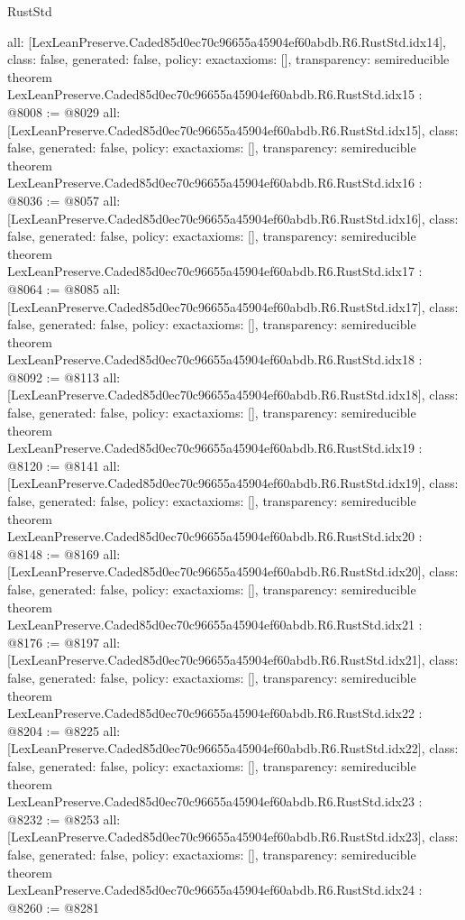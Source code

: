 \begin{lexlean}{RustStd}
\begin{coremodule}
{  all: [LexLeanPreserve.Caded85d0ec70c96655a45904ef60abdb.R6.RustStd.idx14],
  class: false,
  generated: false,
  policy: exact{axioms: []},
  transparency: semireducible
}
theorem LexLeanPreserve.Caded85d0ec70c96655a45904ef60abdb.R6.RustStd.idx15 : @8008 := @8029 {
  all: [LexLeanPreserve.Caded85d0ec70c96655a45904ef60abdb.R6.RustStd.idx15],
  class: false,
  generated: false,
  policy: exact{axioms: []},
  transparency: semireducible
}
theorem LexLeanPreserve.Caded85d0ec70c96655a45904ef60abdb.R6.RustStd.idx16 : @8036 := @8057 {
  all: [LexLeanPreserve.Caded85d0ec70c96655a45904ef60abdb.R6.RustStd.idx16],
  class: false,
  generated: false,
  policy: exact{axioms: []},
  transparency: semireducible
}
theorem LexLeanPreserve.Caded85d0ec70c96655a45904ef60abdb.R6.RustStd.idx17 : @8064 := @8085 {
  all: [LexLeanPreserve.Caded85d0ec70c96655a45904ef60abdb.R6.RustStd.idx17],
  class: false,
  generated: false,
  policy: exact{axioms: []},
  transparency: semireducible
}
theorem LexLeanPreserve.Caded85d0ec70c96655a45904ef60abdb.R6.RustStd.idx18 : @8092 := @8113 {
  all: [LexLeanPreserve.Caded85d0ec70c96655a45904ef60abdb.R6.RustStd.idx18],
  class: false,
  generated: false,
  policy: exact{axioms: []},
  transparency: semireducible
}
theorem LexLeanPreserve.Caded85d0ec70c96655a45904ef60abdb.R6.RustStd.idx19 : @8120 := @8141 {
  all: [LexLeanPreserve.Caded85d0ec70c96655a45904ef60abdb.R6.RustStd.idx19],
  class: false,
  generated: false,
  policy: exact{axioms: []},
  transparency: semireducible
}
theorem LexLeanPreserve.Caded85d0ec70c96655a45904ef60abdb.R6.RustStd.idx20 : @8148 := @8169 {
  all: [LexLeanPreserve.Caded85d0ec70c96655a45904ef60abdb.R6.RustStd.idx20],
  class: false,
  generated: false,
  policy: exact{axioms: []},
  transparency: semireducible
}
theorem LexLeanPreserve.Caded85d0ec70c96655a45904ef60abdb.R6.RustStd.idx21 : @8176 := @8197 {
  all: [LexLeanPreserve.Caded85d0ec70c96655a45904ef60abdb.R6.RustStd.idx21],
  class: false,
  generated: false,
  policy: exact{axioms: []},
  transparency: semireducible
}
theorem LexLeanPreserve.Caded85d0ec70c96655a45904ef60abdb.R6.RustStd.idx22 : @8204 := @8225 {
  all: [LexLeanPreserve.Caded85d0ec70c96655a45904ef60abdb.R6.RustStd.idx22],
  class: false,
  generated: false,
  policy: exact{axioms: []},
  transparency: semireducible
}
theorem LexLeanPreserve.Caded85d0ec70c96655a45904ef60abdb.R6.RustStd.idx23 : @8232 := @8253 {
  all: [LexLeanPreserve.Caded85d0ec70c96655a45904ef60abdb.R6.RustStd.idx23],
  class: false,
  generated: false,
  policy: exact{axioms: []},
  transparency: semireducible
}
theorem LexLeanPreserve.Caded85d0ec70c96655a45904ef60abdb.R6.RustStd.idx24 : @8260 := @8281 {
}
\end{coremodule}
\end{lexlean}
